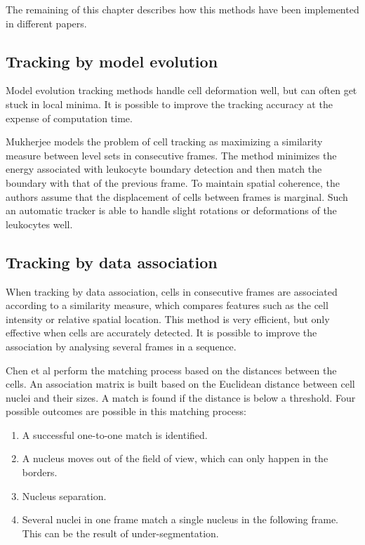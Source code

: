 \documentclass[12pt,a4paper,openany]{book}
\begin{document}
The remaining of this chapter describes how this methods have been implemented in different papers.

\subsection{Tracking by model evolution}

Model evolution tracking methods handle cell deformation well, but can often get stuck in local minima. It is possible to improve the tracking accuracy at the expense of computation time.

Mukherjee \cite{mukherjee04} models the problem of cell tracking as maximizing a similarity measure between level sets in consecutive frames. The method minimizes the energy associated with leukocyte boundary detection and then match the boundary with that of the previous frame. To maintain spatial coherence, the authors assume that the displacement of cells between frames is marginal. Such an automatic tracker is able to handle slight rotations or deformations of the leukocytes well.

\subsection{Tracking by data association}

When tracking by data association, cells in consecutive frames are associated according to a similarity measure, which compares features such as the cell intensity or relative spatial location. This method is very efficient, but only effective when cells are accurately detected. It is possible to improve the association by analysing several frames in a sequence.

Chen et al \cite{chen06} perform the matching process based on the distances between the cells. An association matrix is built based on the Euclidean distance between cell nuclei and their sizes. A match is found if the distance is below a threshold. Four possible outcomes are possible in this matching process:

\begin{enumerate}
	\item A successful one-to-one match is identified.
	\item A nucleus moves out of the field of view, which can only happen in the borders.
	\item Nucleus separation.
	\item Several nuclei in one frame match a single nucleus in the following frame. This can be the result of under-segmentation.
\end{enumerate}
\end{document}
